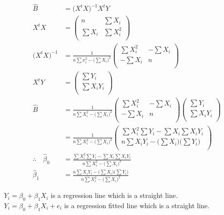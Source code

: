 \documentclass[11pt,a4paper]{article}
\theoremstyle{definition}
\begin{document}
\begin{align*}
\widehat{B} & = \big(X^tX\big)^{-1}X^tY\\
X^tX & =
\begin{pmatrix}
n & \sum X_i\\
\sum X_i & \sum X_i^2\\
\end{pmatrix}\\
  \big(X^tX\big)^{-1} & =\frac{1}{n\sum x^2_i-\big(\sum X_i\big)^2}
\begin{pmatrix}
\sum X_i^2 & -\sum X_i\\
-\sum X_i & n\\
\end{pmatrix}\\
X^tY & = 
\begin{pmatrix}
\sum Y_i\\
\sum X_iY_i\\
\end{pmatrix}\\
\widehat{B} & = \frac{1}{n\sum X_i^2-\big(\sum X_i\big)^2}
\begin{pmatrix}
\sum X_i^2& -\sum X_i\\
-\sum X_i & n\\
\end{pmatrix}
\begin{pmatrix}
\sum Y_i\\
\sum X_iY_i\\
\end{pmatrix}\\
 & = \frac{1}{n\sum X_i^2-\big(\sum X_i\big)^2}
\begin{pmatrix}
\sum X_i^2\sum Y_i-\sum X_i\sum X_iY_i\\
n\sum X_iY_i -\big(\sum X_i\big)\big(\sum Y_i\big)\\
\end{pmatrix}\\
\therefore\quad  \widehat{\beta}_0 & = \frac{\sum X^2_i\sum Y_i-\sum X_i\sum X_iY_i}{n\sum X_i^2-\big(\sum X_i\big)^2}\\
\widehat{\beta}_1 & = \frac{n\sum X_iY_i-\big(\sum X_i\big)\big(\sum Y_i\big)}{n\sum X_i^2-\big(\sum X_i\big)^2}
\end{align*}


$Y_i=\beta_0+\beta_1X_i$ is a regression line which is a straight line.\\

$Y_i=\beta_0+\beta_1X_i+e_i$ is a regression fitted line which is a straight line.\\
\end{document}
